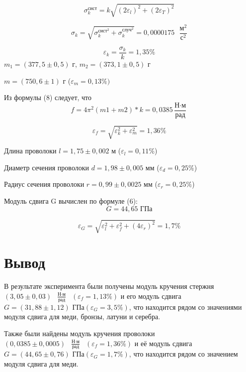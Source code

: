 \documentclass[a4paper, 12pt]{article}
\begin{document}
\[ \sigma_k^{\text{сист}} = k\sqrt{(2\varepsilon_l)^2+(2\varepsilon_T)^2}\]

\[ \sigma_{k} = \sqrt{\sigma_k^{{\text{сист}}^2}+\sigma_k^{{\text{случ}}^2}} = 0,0000175 \text{ }\frac{\text{м}^2}{\text{с}^2}\]

\[ \varepsilon_k = \frac{\sigma_k}{k} = 1,35 \%\]
$m_1 = (377,5 \pm 0,5)$ г, $m_2 = (373,1 \pm 0,5)$ г

$m = (750,6 \pm 1)$ г ($\varepsilon_m = 0,13 \%)$

Из формулы (8) следует, что
\[f=4\pi^2(m1+m2)*k = 0,0385 \frac{\text{Н}\cdot\text{м}}{\text{рад}}\]

\[ \varepsilon_f = \sqrt{\varepsilon_k^2+\varepsilon_m^2} = 1,36 \%\]

Длина проволоки $l = 1,75 \pm 0,002$ м ($\varepsilon_l = 0,11\%$)

Диаметр сечения проволоки $d = 1,98\pm 0,005 $ мм ($\varepsilon_d = 0,25\%$)

Радиус сечения проволоки $r = 0,99\pm 0,0025 $ мм ($\varepsilon_r = 0,25\%$)

Модуль сдвига G вычислен по формуле (6):
\[G = 44,65 \text{ ГПа}\]

\[ \varepsilon_G = \sqrt{\varepsilon_l^2+\varepsilon_f^2+(4\varepsilon_r)^2} = 1,7 \%\]

\section{Вывод}
В результате эксперимента были получены модуль кручения стержня $(3,05 \pm 0,03) \text{ }\frac{\text{Н$\cdot$м}}{\text{рад}}\text{ }(\varepsilon_f = 1,13 \%)$ и его модуль сдвига $G = (31,88 \pm 1,12) \text{ ГПа} (\varepsilon_G = 3,5 \%)$, что находится рядом со значениями модуля сдвига для меди, бронзы, латуни и серебра.

Также были найдены модуль кручения проволоки $(0,0385 \pm 0,0005) \text{ }\frac{\text{Н$\cdot$м}}{\text{рад}}\text{ }(\varepsilon_f = 1,36 \%)$ и её модуль сдвига $G = (44,65 \pm 0,76) \text{ ГПа} (\varepsilon_G = 1,7 \%)$, что находится рядом со значением модуля сдвига для меди.
\end{document}
